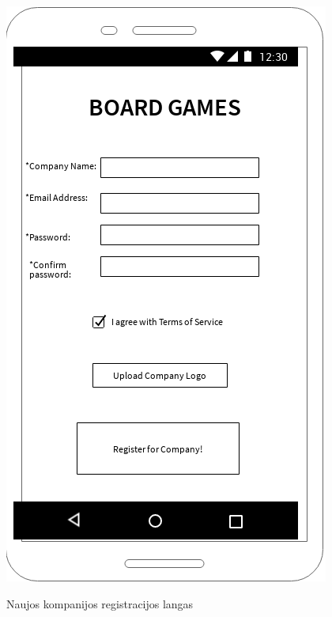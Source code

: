\documentclass{VUMIFPSkursinis}
\begin{document}
\begin{figure}[H]
	\centering
	\caption{Naujos kompanijos registracijos langas}
	\includegraphics[scale=0.9]{img/company_register}
	\label{img:company_register}
\end{figure}
\end{document}
